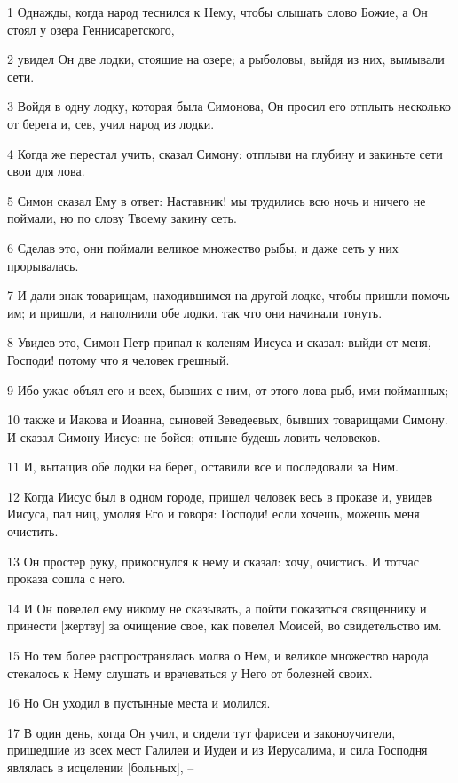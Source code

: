 \par 1 Однажды, когда народ теснился к Нему, чтобы слышать слово Божие, а Он стоял у озера Геннисаретского,
\par 2 увидел Он две лодки, стоящие на озере; а рыболовы, выйдя из них, вымывали сети.
\par 3 Войдя в одну лодку, которая была Симонова, Он просил его отплыть несколько от берега и, сев, учил народ из лодки.
\par 4 Когда же перестал учить, сказал Симону: отплыви на глубину и закиньте сети свои для лова.
\par 5 Симон сказал Ему в ответ: Наставник! мы трудились всю ночь и ничего не поймали, но по слову Твоему закину сеть.
\par 6 Сделав это, они поймали великое множество рыбы, и даже сеть у них прорывалась.
\par 7 И дали знак товарищам, находившимся на другой лодке, чтобы пришли помочь им; и пришли, и наполнили обе лодки, так что они начинали тонуть.
\par 8 Увидев это, Симон Петр припал к коленям Иисуса и сказал: выйди от меня, Господи! потому что я человек грешный.
\par 9 Ибо ужас объял его и всех, бывших с ним, от этого лова рыб, ими пойманных;
\par 10 также и Иакова и Иоанна, сыновей Зеведеевых, бывших товарищами Симону. И сказал Симону Иисус: не бойся; отныне будешь ловить человеков.
\par 11 И, вытащив обе лодки на берег, оставили все и последовали за Ним.
\par 12 Когда Иисус был в одном городе, пришел человек весь в проказе и, увидев Иисуса, пал ниц, умоляя Его и говоря: Господи! если хочешь, можешь меня очистить.
\par 13 Он простер руку, прикоснулся к нему и сказал: хочу, очистись. И тотчас проказа сошла с него.
\par 14 И Он повелел ему никому не сказывать, а пойти показаться священнику и принести [жертву] за очищение свое, как повелел Моисей, во свидетельство им.
\par 15 Но тем более распространялась молва о Нем, и великое множество народа стекалось к Нему слушать и врачеваться у Него от болезней своих.
\par 16 Но Он уходил в пустынные места и молился.
\par 17 В один день, когда Он учил, и сидели тут фарисеи и законоучители, пришедшие из всех мест Галилеи и Иудеи и из Иерусалима, и сила Господня являлась в исцелении [больных], --
